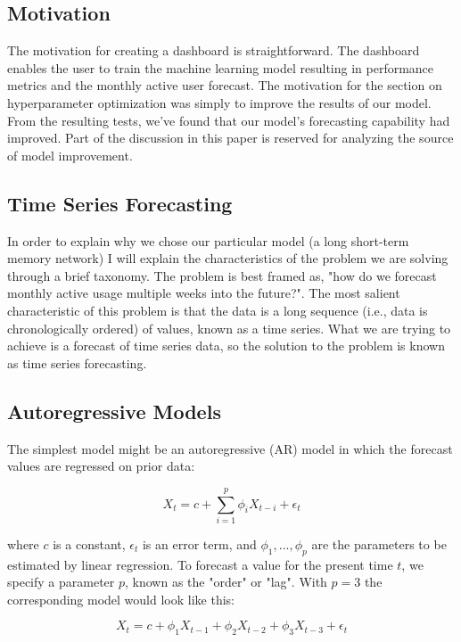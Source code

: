 \documentclass[11pt, oneside]{article}
\begin{document}
\subsection{Motivation}
The motivation for creating a dashboard is straightforward. The dashboard enables the user to train the machine learning model resulting in performance metrics and the monthly active user forecast.
The motivation for the section on hyperparameter optimization was simply to improve the results of our model. From the resulting tests, we've found that our model's forecasting capability had improved. Part of the discussion in this paper is reserved for analyzing the source of model improvement.

\subsection{Time Series Forecasting}

In order to explain why we chose our particular model (a long short-term memory network) I will explain the characteristics of the problem we are solving through a brief taxonomy. The problem is best framed as, "how do we forecast monthly active usage multiple weeks into the future?". The most salient characteristic of this problem is that the data is a long sequence (i.e., data is chronologically ordered) of values, known as a time series. What we are trying to achieve is a forecast of time series data, so the solution to the problem is known as time series forecasting.

\subsection{Autoregressive Models}

The simplest model might be an autoregressive (AR) model in which the forecast values are regressed on prior data:

\begin{equation}
  \label{eq:1}
  X_t = c + \sum_{i=1}^p \phi_i X_{t-i} + \epsilon_t
\end{equation}

where $c$ is a constant, $\epsilon_t$ is an error term, and $\phi_1, ..., \phi_p$ are the parameters to be estimated by linear regression. To forecast a value for the present time $t$, we specify a parameter $p$, known as the "order" or "lag". With $p=3$ the corresponding model would look like this:

\begin{equation}
  \label{eq:2}
  X_t = c + \phi_1 X_{t-1} + \phi_2 X_{t-2} + \phi_3 X_{t-3} + \epsilon_t
\end{equation}
\end{document}
